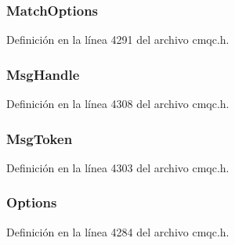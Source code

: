 \subsubsection[{Match\+Options}]{ Match\+Options}\label{structtag_m_q_g_m_o_a64325fedf5fee7e9b76f1ad26dceac2b}


Definición en la línea 4291 del archivo cmqc.\+h.

\hypertarget{structtag_m_q_g_m_o_a510e3e3ff77ec3134832fe65c61fc250}{}
\subsubsection[{Msg\+Handle}]{ Msg\+Handle}\label{structtag_m_q_g_m_o_a510e3e3ff77ec3134832fe65c61fc250}


Definición en la línea 4308 del archivo cmqc.\+h.

\hypertarget{structtag_m_q_g_m_o_a7a9f6d7dcb4ca77398c126fa4101733d}{}
\subsubsection[{Msg\+Token}]{ Msg\+Token}\label{structtag_m_q_g_m_o_a7a9f6d7dcb4ca77398c126fa4101733d}


Definición en la línea 4303 del archivo cmqc.\+h.

\hypertarget{structtag_m_q_g_m_o_ad7aff2d6c6044809464380998d24ec5c}{}
\subsubsection[{Options}]{ Options}\label{structtag_m_q_g_m_o_ad7aff2d6c6044809464380998d24ec5c}


Definición en la línea 4284 del archivo cmqc.\+h.

\hypertarget{structtag_m_q_g_m_o_a9a6d7674e570f3815495c51129f3828e}{}
